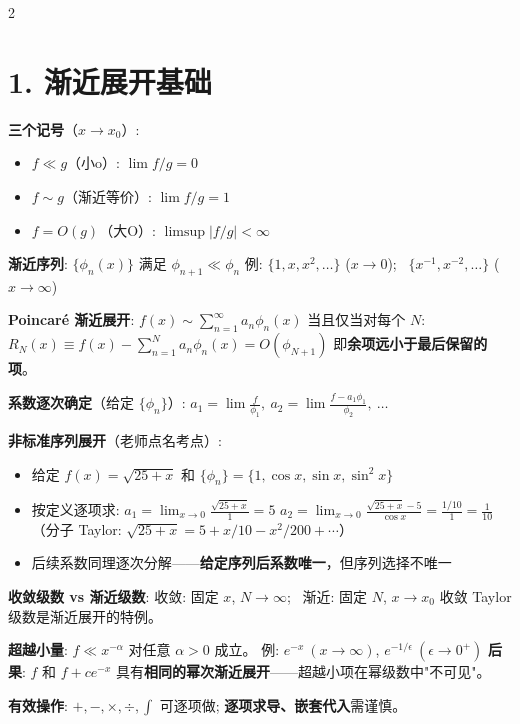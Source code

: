 \documentclass[10pt,a4paper]{article}
\newcommand{\eps}{\epsilon}
\begin{document}
\fontsize{9.3}{11.5}\selectfont
\begin{multicols}{2}

\section{1. 渐近展开基础}

\textbf{三个记号}（$x \to x_0$）:
\begin{itemize}
\item $f \ll g$（小o）: $\lim f/g = 0$
\item $f \sim g$（渐近等价）: $\lim f/g = 1$
\item $f = O(g)$（大O）: $\limsup |f/g| < \infty$
\end{itemize}

\textbf{渐近序列}: $\{\phi_n(x)\}$ 满足 $\phi_{n+1} \ll \phi_n$\;
例: $\{1, x, x^2, \dots\}$ ($x\to0$); \ $\{x^{-1}, x^{-2}, \dots\}$ ($x\to\infty$)

\textbf{Poincaré 渐近展开}:
$f(x) \sim \sum_{n=1}^{\infty} a_n \phi_n(x)$ 当且仅当对每个 $N$:
$R_N(x) \equiv f(x) - \sum_{n=1}^N a_n\phi_n(x) = O(\phi_{N+1})$
即\textbf{余项远小于最后保留的项}。

\textbf{系数逐次确定}（给定 $\{\phi_n\}$）:
$a_1 = \lim\frac{f}{\phi_1},\ a_2 = \lim\frac{f-a_1\phi_1}{\phi_2},\ \ldots$

\textbf{非标准序列展开}（老师点名考点）:
\begin{itemize}
\item 给定 $f(x)=\sqrt{25+x}$ 和 $\{\phi_n\}=\{1,\cos x,\sin x,\sin^2 x\}$
\item 按定义逐项求:
$a_1 = \lim_{x\to0} \frac{\sqrt{25+x}}{1} = 5$
$a_2 = \lim_{x\to0} \frac{\sqrt{25+x}-5}{\cos x}
      = \frac{1/10}{1} = \frac{1}{10}$
（分子 Taylor: $\sqrt{25+x}=5+x/10-x^2/200+\cdots$）
\item 后续系数同理逐次分解——\textbf{给定序列后系数唯一}，但序列选择不唯一
\end{itemize}

\textbf{收敛级数 vs 渐近级数}:
收敛: 固定 $x$, $N\to\infty$; \ 渐近: 固定 $N$, $x\to x_0$\;
收敛 Taylor 级数是渐近展开的特例。

\textbf{超越小量}: $f \ll x^{-\alpha}$ 对任意 $\alpha>0$ 成立。
例: $e^{-x}\ (x\to\infty)$, $e^{-1/\eps}\ (\eps\to0^+)$
\textbf{后果}: $f$ 和 $f+ce^{-x}$ 具有\textbf{相同的幂次渐近展开}——超越小项在幂级数中"不可见"。

\textbf{有效操作}: $+,-,\times,\div,\int$ 可逐项做;
\textbf{逐项求导、嵌套代入}需谨慎。


\end{multicols}
\end{document}
